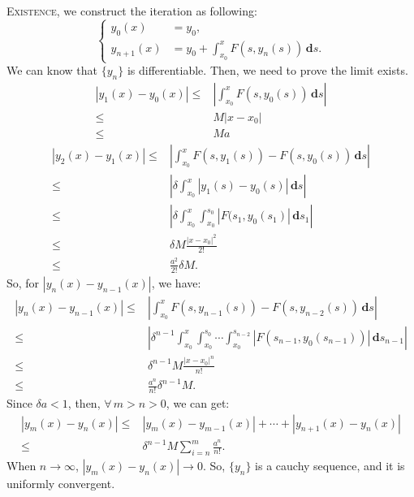 \documentclass[en, normal, 11pt, black]{elegantnote}
\renewenvironment{proof}{\begin{tcolorbox}[colback=white, colframe=black!50, breakable, title=Proof. ]\setlength{\parskip}{0.8em}}{\,\\\rightline{$\square$}\end{tcolorbox}}
\newcommand{\der}{\,\mathbf{d}}
\begin{document}
    \begin{proof}
        \textsc{Existence}, we construct the iteration as following: 
        \begin{equation*}
            \left\{
                \begin{aligned}
                    y_0(x)&=y_0, \\
                    y_{n+1}(x)&=y_0+\int_{x_0}^xF(s, y_{n}(s))\der s. 
                \end{aligned}
            \right.
        \end{equation*}
        We can know that $\{y_n\}$ is differentiable. Then, we need to prove the limit exists. 
        \begin{align*}
            |y_1(x)-y_0(x)|\leqslant & \left|\int_{x_0}^x F(s, y_0(s))\der s\right|\\
            \leqslant & M|x-x_0|\\
            \leqslant & Ma
        \end{align*}
        \begin{align*}
            |y_2(x)-y_1(x)|\leqslant & \left|\int_{x_0}^x F(s, y_1(s))-F(s, y_0(s))\der s\right|\\
            \leqslant & \left|\delta\int_{x_0}^x |y_1(s)-y_0(s)|\der s\right|\\
            \leqslant & \left|\delta\int_{x_0}^x \int_{x_0}^{s_0} |F(s_1,y_0(s_1)|\der s_1\right|\\
            \leqslant & \delta M\frac{|x-x_0|^2}{2!}\\
            \leqslant & \frac{a^2}{2!}\delta M. 
        \end{align*}
        So, for $|y_n(x)-y_{n-1}(x)|$, we have: 
        \begin{align*}
            |y_n(x)-y_{n-1}(x)| \leqslant & \left|\int_{x_0}^x F(s, y_{n-1}(s))-F(s, y_{n-2}(s))\der s\right|\\
            \leqslant & \left|\delta^{n-1}\int_{x_0}^x\int_{x_0}^{s_0}\cdots\int_{x_0}^{s_{n-2}} |F(s_{n-1}, y_0(s_{n-1}))|\der s_{n-1}\right|\\
            \leqslant & \delta^{n-1} M\frac{|x-x_0|^n}{n!}\\
            \leqslant & \frac{a^n}{n!}\delta^{n-1} M. 
        \end{align*}
        Since $\delta a<1$, then, $\forall\,m>n>0$, we can get: 
        \begin{align*}
            |y_m(x)-y_{n}(x)| \leqslant & |y_m(x)-y_{m-1}(x)|+\cdots+|y_{n+1}(x)-y_{n}(x)|\\
            \leqslant & \delta^{n-1} M \sum_{i=n}^m \frac{a^n}{n!}. 
        \end{align*}
        When $n\to \infty$, $|y_m(x)-y_{n}(x)|\to 0$. So, $\{y_n\}$ is a cauchy sequence, and it is uniformly convergent. 
        

\end{proof}
\end{document}
